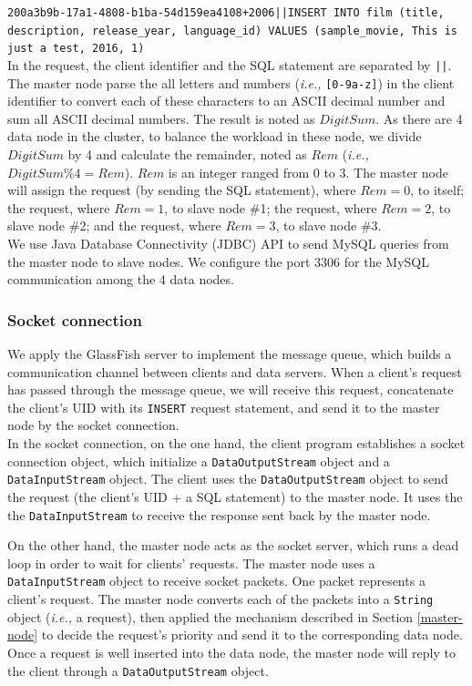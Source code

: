\documentclass{article}
\begin{document}
\texttt{200a3b9b-17a1-4808-b1ba-54d159ea4108+2006||INSERT INTO film (title, description, release\_year, language\_id) VALUES (\textquotesingle sample\_movie\textquotesingle, \textquotesingle This is just a test\textquotesingle, 2016, 1)}\\

In the request, the client identifier and the SQL statement are separated by \texttt{||}. The master node parse the all letters and numbers (\emph{i.e.,} \texttt{[0-9a-z]}) in the client identifier to convert each of these characters to an ASCII decimal number and sum all ASCII decimal numbers. The result is noted as $DigitSum$. As there are 4 data node in the cluster, to balance the workload in these node, we divide $DigitSum$ by 4 and calculate the remainder, noted as $Rem$ (\emph{i.e.,} $DigitSum\%4=Rem$). $Rem$ is an integer ranged from 0 to 3. The master node will assign the request (by sending the SQL statement), where $Rem=0$, to itself; the request, where $Rem=1$, to slave node \#1; the request, where $Rem=2$, to slave node \#2; and the request, where $Rem=3$, to slave node \#3.\\

We use Java Database Connectivity (JDBC) API to send MySQL queries from the master node to slave nodes. We configure the port 3306 for the MySQL communication among the 4 data nodes.

\subsubsection{Socket connection}
We apply the GlassFish server to implement the message queue, which builds a communication channel between clients and data servers. When a client's request has passed through the message queue, we will receive this request, concatenate the client's UID with its \texttt{INSERT} request statement, and send it to the master node by the socket connection.\\

In the socket connection, on the one hand, the client program establishes a socket connection object, which initialize a \texttt{DataOutputStream} object and a \texttt{DataInputStream} object. The client uses the \texttt{DataOutputStream} object to send the request (the client's UID + a SQL statement) to the master node. It uses the the \texttt{DataInputStream} to receive the response sent back by the master node.

On the other hand, the master node acts as the socket server, which runs a dead loop in order to wait for clients' requests. The master node uses a \texttt{DataInputStream} object to receive socket packets. One packet represents a client's request. The master node converts each of the packets into a \texttt{String} object (\emph{i.e.,} a request), then applied the mechanism described in Section \ref{master-node} to decide the request's priority and send it to the corresponding data node. Once a request is well inserted into the data node, the master node will reply to the client through a \texttt{DataOutputStream} object.\\
\end{document}
